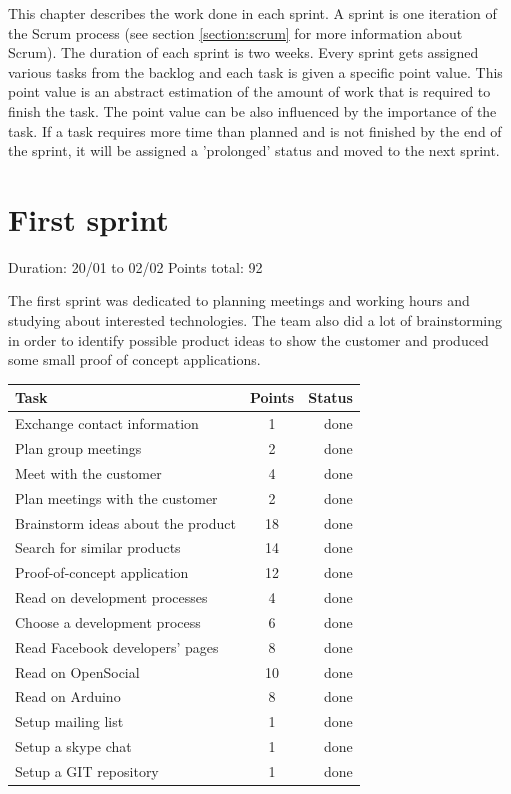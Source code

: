 
This chapter describes the work done in each sprint. A sprint is one iteration of the Scrum process
(see section \ref{section:scrum} for more information about Scrum). The duration of each sprint is two weeks.
Every sprint gets assigned various tasks from the backlog and each task is given a specific point value.
This point value is an abstract estimation of the amount of work that is required to finish the task.
The point value can be also influenced by the importance of the task. If a task requires more time than
planned and is not finished by the end of the sprint, it will be assigned a 'prolonged' status and
moved to the next sprint.

\newpage

\section{First sprint}

Duration: 20/01 to 02/02
Points total: 92

The first sprint was dedicated to planning meetings and working hours
and studying about interested technologies. The team also did a lot of
brainstorming in order to identify possible product ideas to show the
customer and produced some small proof of concept applications.

\begin{table}[ht!]
\begin{tabular}{ | l | c | r | }

\hline
\textbf{Task} & \textbf{Points} & \textbf{Status} \\
\hline

Exchange contact information		& 1  & done \\
\hline
Plan group meetings			& 2  & done \\
\hline
Meet with the customer			& 4  & done \\
\hline
Plan meetings with the customer		& 2  & done \\
\hline
Brainstorm ideas about the product	& 18 & done \\
\hline
Search for similar products		& 14 & done \\
\hline
Proof-of-concept application		& 12 & done \\
\hline
Read on development processes		& 4  & done \\
\hline
Choose a development process		& 6  & done \\
\hline
Read Facebook developers' pages		& 8  & done \\
\hline
Read on OpenSocial			& 10 & done \\
\hline
Read on Arduino				& 8  & done \\
\hline
Setup mailing list			& 1  & done \\
\hline
Setup a skype chat			& 1  & done \\
\hline
Setup a GIT repository			& 1  & done \\
\hline

\end{tabular}
\end{table}

